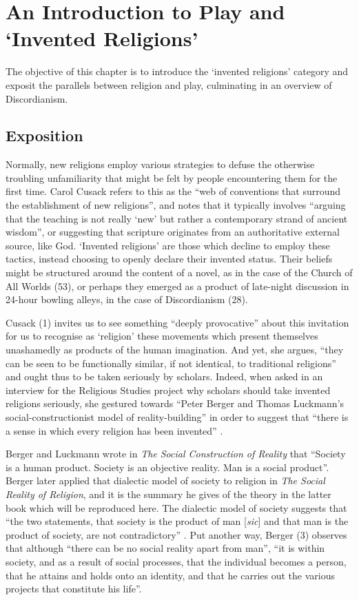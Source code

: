\documentclass[Draft.tex]{subfiles}
\begin{document}
\chapter{An Introduction to Play and `Invented Religions'}

The objective of this chapter is to introduce
the `invented religions' category
and exposit the parallels between religion and play,
culminating in an overview of Discordianism.

\section*{Exposition}
Normally, new religions employ various strategies
to defuse the otherwise troubling unfamiliarity
that might be felt by people encountering them for the first time.
Carol Cusack \parencite*[1]{Cusack10} refers to this as the
``web of conventions that surround the establishment of new religions'',
and notes that it typically involves
``arguing that the teaching is not really `new' but rather
a contemporary strand of ancient wisdom'',
or suggesting that scripture originates from
an authoritative external source, like God.
`Invented religions' are those which decline to employ these tactics,
instead choosing to openly declare their invented status.
Their beliefs might be structured around the content of a novel,
as in the case of the Church of All Worlds (53),
or perhaps they emerged as a product of late-night discussion in
24-hour bowling alleys, in the case of Discordianism (28).

Cusack (1) invites us to see something ``deeply provocative''
about this invitation for us to recognise as `religion'
these movements which present themselves unashamedly as
products of the human imagination.
And yet, she argues, ``they can be seen to be functionally similar,
if not identical, to traditional religions''
and ought thus to be taken seriously by scholars.
Indeed, when asked in an interview for the Religious Studies project
why scholars should take invented religions seriously,
she  gestured towards ``Peter Berger and Thomas Luckmann’s
social-constructionist model of reality-building'' in order to suggest
that ``there is a sense in which every religion has been invented''
\parencite*{CusackPodcast}.

Berger and Luckmann \parencite*[79]{Berger67} wrote in
\textit{The Social Construction of Reality} that
``Society is a human product. Society is an objective reality.
Man is a social product''.
Berger later applied that dialectic model of society to religion
in \textit{The Social Reality of Religion},
and it is the summary he gives of the theory
in the latter book which will be reproduced here.
The dialectic model of society suggests that
``the two statements, that society is the product of man
[\textit{sic}] and that
man is the product of society, are not contradictory''
\parencite[3]{Berger69}.
Put another way, Berger (3) observes that although
``there can be no social reality apart from man'',
``it is within society, and as a result of social processes,
that the individual becomes a person,
that he attains and holds onto an identity,
and that he carries out the various projects that constitute his life''.
\end{document}
